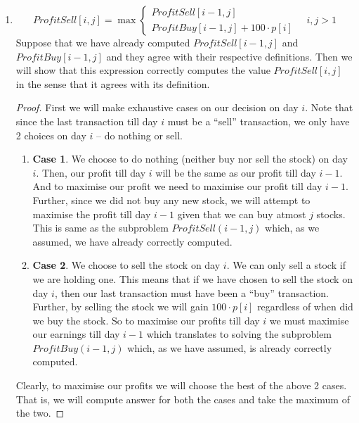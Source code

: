 \documentclass[answers]{exam}
\begin{document}
\begin{questions}
\begin{solution}
\begin{enumerate}
\begin{proof}
    \end{proof}
    \item
    \[
        ProfitSell[i, j] = \max
        \begin{cases}
            ProfitSell[i-1, j]\\
            ProfitBuy[i-1, j] + 100 \cdot p[i]
        \end{cases}
        \quad i,j > 1
    \]
    Suppose that we have already computed $ProfitSell[i-1, j]$ and $ProfitBuy[i-1, j]$ and they agree with their respective definitions. Then we will show that this expression correctly computes the value $ProfitSell[i, j]$ in the sense that it agrees with its definition.
    \begin{proof}
    First we will make exhaustive cases on our decision on day $i$. Note that since the last transaction till day $i$ must be a ``sell'' transaction, we only have 2 choices on day $i$ -- do nothing or sell.
    \begin{enumerate}
        \item \textbf{Case 1}. We choose to do nothing (neither buy nor sell the stock) on day $i$. Then, our profit till day $i$ will be the same as our profit till day $i-1$. And to maximise our profit we need to maximise our profit till day $i-1$. Further, since we did not buy any new stock, we will attempt to maximise the profit till day $i-1$ given that we can buy atmost $j$ stocks. This is same as the subproblem $ProfitSell(i-1, j)$ which, as we assumed, we have already correctly computed.
        \item \textbf{Case 2}. We choose to sell the stock on day $i$. We can only sell a stock if we are holding one. This means that if we have chosen to sell the stock on day $i$, then our last transaction must have been a ``buy'' transaction. Further, by selling the stock we will gain $100 \cdot p[i]$ regardless of when did we buy the stock. So to maximise our profits till day $i$ we must maximise our earnings till day $i-1$ which translates to solving the subproblem $ProfitBuy(i-1, j)$ which, as we have assumed, is already correctly computed.
    \end{enumerate}
    Clearly, to maximise our profits we will choose the best of the above 2 cases. That is, we will compute answer for both the cases and take the maximum of the two.
    \end{proof}    
\end{enumerate}

\end{solution}
\end{questions}
\end{document}

